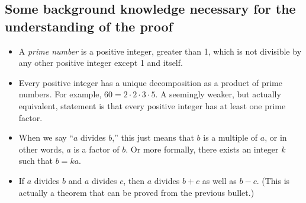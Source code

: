 \documentclass[11pt,oneside]{amsart}
\theoremstyle{definition}
\theoremstyle{plain}
\begin{document}
    \subsection*{Some background knowledge necessary for the understanding of the proof}
    \begin{itemize}
        \item A \emph{prime number} is a positive integer, greater than 1, which is not divisible by any other positive integer except 1 and itself.
        \item Every positive integer has a unique decomposition as a product of prime numbers. For example, $60=2\cdot 2\cdot 3\cdot 5$. A seemingly weaker, but actually equivalent, statement is that every positive integer has at least one prime factor.
        \item When we say ``$a$ divides $b$,'' this just means that $b$ is a multiple of $a$, or in other words, $a$ is a factor of $b$. Or more formally, there exists an integer $k$ such that $b=ka$.
        \item If $a$ divides $b$ and $a$ divides $c$, then $a$ divides $b+c$ as well as $b-c$. (This is actually a theorem that can be proved from the previous bullet.)
    \end{itemize}
\end{document}
